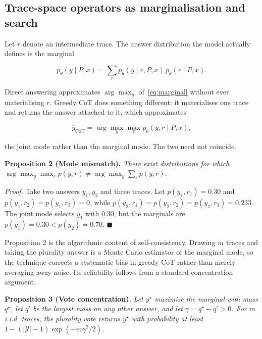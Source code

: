 \documentclass[conference]{IEEEtran}
\begin{document}
\subsection{Trace-space operators as marginalisation and search}
\label{sec:trace-operators}

Let $r$ denote an intermediate trace. The answer distribution the model actually defines is the marginal

\begin{equation}
p_{\theta}(y \mid P, x) = \sum_{r} p_{\theta}(y \mid r, P, x) \, p_{\theta}(r \mid P, x).
\label{eq:marginal}
\end{equation}

Direct answering approximates $\arg\max_{y}$ of~\eqref{eq:marginal} without ever materialising $r$. Greedy CoT does something different: it materialises one trace and returns the answer attached to it, which approximates

\begin{equation}
\hat{y}_{\mathrm{CoT}} = \arg\max_{y} \max_{r} p_{\theta}(y, r \mid P, x),
\label{eq:cot-joint}
\end{equation}

the joint mode rather than the marginal mode. The two need not coincide.

\textbf{Proposition 2 (Mode mismatch).} \textit{There exist distributions for which $\arg\max_y\max_r p(y,r) \neq \arg\max_y\sum_r p(y,r)$.}

\textit{Proof.} Take two answers $y_{1}, y_{2}$ and three traces. Let $p(y_{1}, r_{1}) = 0.30$ and $p(y_{1}, r_{2}) = p(y_{1}, r_{3}) = 0$, while $p(y_{2}, r_{1}) = p(y_{2}, r_{2}) = p(y_{2}, r_{3}) = 0.23\overline{3}$. The joint mode selects $y_{1}$ with 0.30, but the marginals are $p(y_{1}) = 0.30 < p(y_{2}) = 0.70$. $\blacksquare$

Proposition 2 is the algorithmic content of self-consistency. Drawing $m$ traces and taking the plurality answer is a Monte Carlo estimator of the marginal mode, so the technique corrects a systematic bias in greedy CoT rather than merely averaging away noise. Its reliability follows from a standard concentration argument.

\textbf{Proposition 3 (Vote concentration).} \textit{Let $y^{\star}$ maximise the marginal with mass $q^{\star}$, let $q'$ be the largest mass on any other answer, and let $\gamma = q^{\star} - q' > 0$. For $m$ i.i.d. traces, the plurality vote returns $y^{\star}$ with probability at least $1 - (|\mathcal{Y}| - 1)\exp(-m\gamma^{2} /2)$.}
\end{document}
